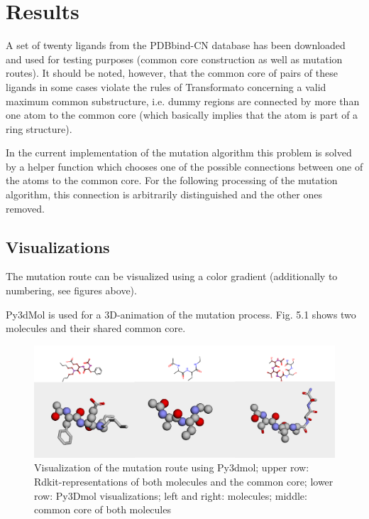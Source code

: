 \chapter{Results}

A set of twenty ligands from the PDBbind-CN database has been downloaded and used for testing
purposes (common core construction as well as mutation routes). It
should be noted, however, that the common core of pairs of these ligands
in some cases violate the rules of Transformato concerning a valid
maximum common substructure, i.e. dummy regions are connected by more
than one atom to the common core (which basically implies that the
atom is part of a ring structure). 

In the current implementation of the mutation algorithm this problem
is solved by a helper function which chooses one of the possible connections
between one of the atoms to the common core. For the following processing
of the mutation algorithm, this connection is arbitrarily distinguished
and the other ones removed. 


\section{Visualizations}

The mutation route can be visualized using a color gradient (additionally
to numbering, see figures above).

Py3dMol is used for a 3D-animation of the mutation process. Fig. 5.1
shows two molecules and their shared common core.

\begin{figure}
\includegraphics{trafo_py3d_1verkleinert}

\caption{Visualization of the mutation route using Py3dmol; upper row: Rdkit-representations
of both molecules and the common core; lower row: Py3Dmol visualizations;
left and right: molecules; middle: common core of both molecules}

\end{figure}


